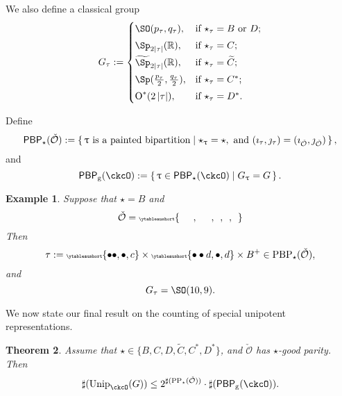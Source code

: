 \documentclass[12pt,a4paper]{amsart}
\let\ytb=\ytableaushort
\newcommand{\tytb}[1]{{\tiny\ytb{#1}}}
\def\abs#1{\left|{#1}\right|}
\newcommand{\CO}{{\mathcal {O}}}
\newcommand{\oO}{\operatorname{O}}
\newcommand{\R}{\mathbb R}
\numberwithin{equation}{section}
\newtheorem{thm}{Theorem}[section]
\newtheorem{eg}[thm]{Example}
\theoremstyle{remark}
\def\Unip{\mathrm{Unip}}
\def\CPP{\mathrm{PP}}
\def\PBP{\mathsf{PBP}}
\begin{document}
We also define a classical group
\begin{equation*}%
  G_\tau:=
  \begin{cases}
    \SO(p_\tau, q_\tau), &\hbox{if $\star_\tau=B$ or $D$}; \smallskip\\
    \Sp_{2\abs{\tau}}(\R), &\hbox{if $\star_\tau=C$}; \smallskip\\
    \widetilde{\Sp}_{2\abs{\tau}}(\R), &\hbox{if $\star_\tau=\widetilde{ C}$}; \smallskip \\
    \Sp(\frac{p_\tau}{2}, \frac{q_\tau}{2}), &\hbox{if $\star_\tau=C^*$}; \smallskip \\
    \oO^*(2\abs{\tau}), &\hbox{if $\star_\tau=D^*$}.\\
  \end{cases}
\end{equation*}


Define
\begin{equation*}%
  \PBP_\star(\check \CO) :=\set{ \uptau\textrm{ is a painted
      bipartition} \mid \star_\uptau = \star, \text{ and
    } (\imath_\tau,\jmath_\tau) = (\imath_{\check \CO}, \jmath_{\check \CO})},
\end{equation*}
and
\begin{equation*} %
    \PBP_{\mathrm g}(\ckcO) :=\set{\uptau\in \PBP_{\star}(\ckcO)| G_{\uptau} = G}.
\end{equation*}

\delete{
  \[
    \begin{array}{rl}
      \mathrm{PBP}_\star(\check \CO):=\{ &
                                           \tau\textrm{ is a painted bipartition}  \mid    \star_\tau = \star,
                                           \text{ and } \\  & (\imath_\tau,\jmath_\tau) = (\imath_{\check \CO}, \jmath_{\check \CO})\}.
    \end{array}
  \]
}


\begin{eg} Suppose that $\star=B$ and
  \[
    \check \CO =\tytb{\ \ \ \ \ \ , \ \ \ \ \ \ , \ \ , \ \ , \ \ }
  \]
  Then
  \[
    \tau:= \tytb{\bullet \bullet ,\bullet , c } \times \tytb{\bullet \bullet d ,\bullet , d }\times B^+\in \mathrm{PBP}_{\star}(\check \CO),
  \]
  and
  \[
    G_\tau=\SO(10,9).
  \]
\end{eg}


We now state our final result on the counting of special unipotent representations.

\begin{thm}\label{countup}
  Assume that $\star\in \{B, C,D,\widetilde {C}, C^*, D^*\}$, and $\check \CO$ has $\star$-good parity. Then
  \[
    \sharp(\Unip_{\ckcO}(G))\leq 2^{\sharp(\CPP_\star(\check \CO))} \cdot \sharp (\PBP_{\mathrm g}(\ckcO)).
  \]
\end{thm}
\end{document}
